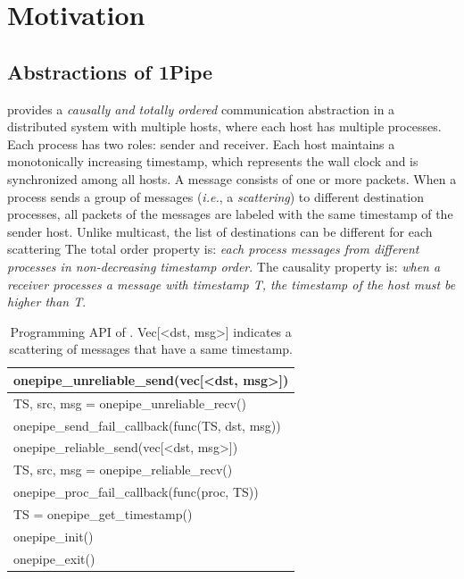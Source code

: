 \section{Motivation}
\label{sec:motivation}

\subsection{Abstractions of 1Pipe}
\label{subsec:abstration}

\sys{} provides a \emph{causally and totally ordered} communication abstraction in a distributed system with multiple hosts, where each host has multiple processes. Each process has two roles: sender and receiver. Each host maintains a monotonically increasing timestamp, which represents the wall clock and is synchronized among all hosts. A message consists of one or more packets. When a process sends a group of messages (\emph{i.e.}, a \emph{scattering}) to different destination processes, all packets of the messages are labeled with the same timestamp of the sender host. Unlike multicast, the list of destinations can be different for each scattering The total order property is: \emph{each process  messages from different processes in non-decreasing timestamp order}. The causality property is: \emph{when a receiver processes a message with timestamp T, the timestamp of the host must be higher than T}.

\begin{table}[htbp]
\centering
\begin{tabular}{l}
	\hline
	onepipe\_unreliable\_send(vec[<dst, msg>]) \\
	\hline
	TS, src, msg = onepipe\_unreliable\_recv() \\
	\hline
	onepipe\_send\_fail\_callback(func(TS, dst, msg)) \\
	\hline
	\hline
	onepipe\_reliable\_send(vec[<dst, msg>]) \\
	\hline
	TS, src, msg = onepipe\_reliable\_recv() \\
	\hline
	onepipe\_proc\_fail\_callback(func(proc, TS)) \\
	\hline
	\hline
	TS = onepipe\_get\_timestamp() \\
	\hline
	onepipe\_init() \\
	\hline
	onepipe\_exit() \\
	\hline
\end{tabular}
\caption{Programming API of \sys{}. Vec[<dst, msg>] indicates a scattering of messages that have a same timestamp.}
\label{tab:abstraction}
\end{table}

